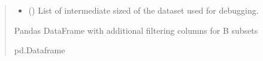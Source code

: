 \documentclass[letterpaper,10pt,english]{sphinxmanual}
\begin{document}
\begin{fulllineitems}
\begin{quote}
\begin{description}
\begin{itemize}
\item {} 
\sphinxAtStartPar
{} (\sphinxstyleliteralemphasis{\sphinxupquote{{[}}}\sphinxstyleliteralemphasis{\sphinxupquote{{[}}}\sphinxstyleliteralemphasis{\sphinxupquote{{]}}}\sphinxstyleliteralemphasis{\sphinxupquote{, }}\sphinxstyleliteralemphasis{\sphinxupquote{{[}}}\sphinxstyleliteralemphasis{\sphinxupquote{{]}}}\sphinxstyleliteralemphasis{\sphinxupquote{{]}}}) \textendash{} List of intermediate sized of the dataset used for debugging.

\end{itemize}

\sphinxAtStartPar
Pandas DataFrame with additional filtering columns for B subsets

\sphinxAtStartPar
pd.Dataframe

\end{description}\end{quote}

\end{fulllineitems}

\end{document}
